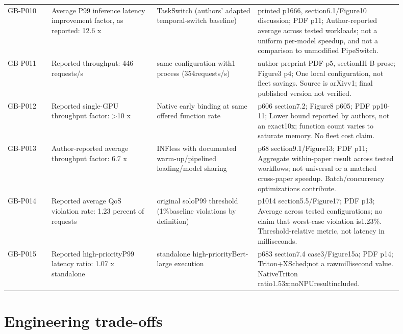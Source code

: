 \documentclass[12pt,a4paper]{article}
\begin{document}
{\begin{longtable}{>{\raggedright\arraybackslash}p{0.1\linewidth}>{\raggedright\arraybackslash}p{0.24\linewidth}>{\raggedright\arraybackslash}p{0.23\linewidth}>{\raggedright\arraybackslash}p{0.33\linewidth}}
GB-P010 & Average P99 inference latency improvement factor, as reported:\allowbreak{} 12.6 x & TaskSwitch (authors' adapted temporal-switch baseline) & printed p1666, section6.1/\allowbreak{}Figure10 discussion; PDF p11; Author-reported average across tested workloads; not a uniform per-model speedup, and not a comparison to unmodified PipeSwitch.\\
GB-P011 & Reported throughput:\allowbreak{} 446 requests/\allowbreak{}s & same configuration with1 process (354requests/\allowbreak{}s) & author preprint PDF p5, sectionIII-B prose; Figure3 p4; One local configuration, not fleet savings. Source is arXivv1; final published version not verified.\\
GB-P012 & Reported single-GPU throughput factor:\allowbreak{} >10 x & Native early binding at same offered function rate & p606 section7.2; Figure8 p605; PDF pp10-11; Lower bound reported by authors, not an exact10x; function count varies to saturate memory. No fleet cost claim.\\
GB-P013 & Author-reported average throughput factor:\allowbreak{} 6.7 x & INFless with documented warm-up/\allowbreak{}pipelined loading/\allowbreak{}model sharing & p68 section9.1/\allowbreak{}Figure13; PDF p11; Aggregate within-paper result across tested workflows; not universal or a matched cross-paper speedup. Batch/\allowbreak{}concurrency optimizations contribute.\\
GB-P014 & Reported average QoS violation rate:\allowbreak{} 1.23 percent of requests & original soloP99 threshold (1\%baseline violations by definition) & p1014 section5.5/\allowbreak{}Figure17; PDF p13; Average across tested configurations; no claim that worst-case violation is1.23\%. Threshold-relative metric, not latency in milliseconds.\\
GB-P015 & Reported high-priorityP99 latency ratio:\allowbreak{} 1.07 x standalone & standalone high-priorityBert-large execution & p683 section7.4 case3/\allowbreak{}Figure15a; PDF p14; Triton+XSched;not a rawmillisecond value. NativeTriton ratio1.53x;noNPUresultincluded.\\
\bottomrule
\end{longtable}}


\section{Engineering trade-offs}
\end{document}
